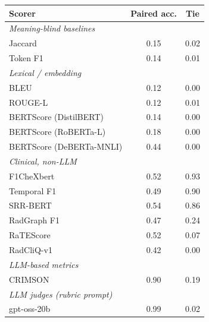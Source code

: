 \begin{tabular}{lcc}
\toprule
\textbf{Scorer} & \textbf{Paired acc.} & \textbf{Tie} \\
\midrule
\multicolumn{3}{l}{\textit{Meaning-blind baselines}} \\
Jaccard & 0.15 & 0.02 \\
Token F1 & 0.14 & 0.01 \\
\multicolumn{3}{l}{\textit{Lexical / embedding}} \\
BLEU & 0.12 & 0.00 \\
ROUGE-L & 0.12 & 0.01 \\
BERTScore (DistilBERT) & 0.14 & 0.00 \\
BERTScore (RoBERTa-L) & 0.18 & 0.00 \\
BERTScore (DeBERTa-MNLI) & 0.44 & 0.00 \\
\multicolumn{3}{l}{\textit{Clinical, non-LLM}} \\
F1CheXbert & 0.52 & 0.93 \\
Temporal F1 & 0.49 & 0.90 \\
SRR-BERT & 0.54 & 0.86 \\
RadGraph F1 & 0.47 & 0.24 \\
RaTEScore & 0.52 & 0.07 \\
RadCliQ-v1 & 0.42 & 0.00 \\
\multicolumn{3}{l}{\textit{LLM-based metrics}} \\
CRIMSON & 0.90 & 0.19 \\
\multicolumn{3}{l}{\textit{LLM judges (rubric prompt)}} \\
gpt-oss-20b & 0.99 & 0.02 \\
\bottomrule
\end{tabular}